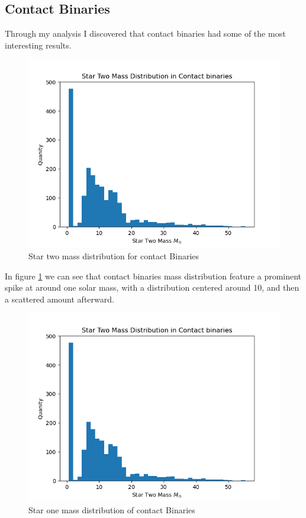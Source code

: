 \documentclass[12pt, letterpaper]{article}
\begin{document}
        \subsection{\centering Contact Binaries}
            Through my analysis I discovered that contact binaries had some of the most interesting results. 
        \begin{figure}[H]
            \centering
            \includegraphics[scale = .6]{figs/Generated Figs/Contact binaries Star Two Mass Distribution.png}
            \caption{Star two mass distribution for contact Binaries}
            \label{contactBinaryStar2MassDistro}
        \end{figure}

        In figure \ref{contactBinaryStar2MassDistro} we can see that contact binaries mass distribution feature a prominent spike at around one solar mass, with a distribution centered around 10, and then a scattered amount afterward. 

        \begin{figure}[H]
            \centering
            \includegraphics[scale = .6]{figs/Generated Figs/Contact binaries Star Two Mass Distribution.png}
            \caption{Star one mass distribution of contact Binaries}
            \label{contactBinarStar1MassDistro}
        \end{figure}
\end{document}
